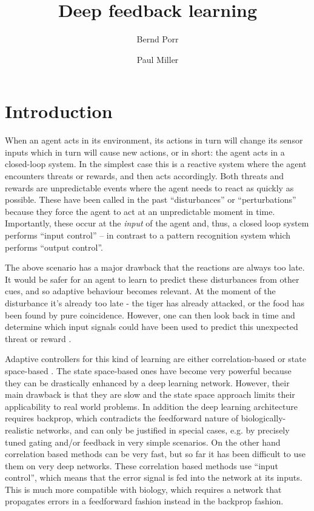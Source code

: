 \documentclass{llncs}
\title{Deep feedback learning}
\author{Bernd Porr \and Paul Miller}
\institute{Glasgow Neuro, bernd,paul@glasgowneuro.tech}
\begin{document}
\maketitle

\begin{abstract}
\end{abstract}

\section{Introduction}
When an agent acts in its environment, its actions in turn will
change its sensor inputs which in turn will cause new actions, or in
short: the agent acts in a closed-loop system. In the simplest case this
is a reactive system where the agent encounters threats or rewards, and
then acts accordingly. Both threats and rewards are unpredictable events
where the agent needs to react as quickly as possible. These have been
called in the past ``disturbances'' or ``perturbations'' because they force
the agent to act at an unpredictable moment in time. Importantly, these
occur at the \textsl{input} of the agent and, thus, a closed loop system
performs ``input control'' -- in contrast to a pattern recognition system
which performs ``output control''.

The above scenario has a major drawback that the reactions are always
too late.  It would be safer for an agent to learn to predict these
disturbances from other cues, and so adaptive behaviour becomes
relevant. At the moment of the disturbance it's already too late - the
tiger has already attacked, or the food has been found by pure
coincidence. However, one can then look back in time and determine
which input signals could have been used to predict this unexpected
threat or reward \cite{Sutton98,Woergoetter2005,PorrNecoInvco2003}.

Adaptive controllers for this kind of learning are either
correlation-based \cite{PorrNecoISO2003,Verschure91} or state
space-based \cite{Dayan1992,Sutton98}. The state space-based ones
have become very powerful because they can be drastically enhanced by
a deep learning network. However, their main drawback is that they are
slow and the state space approach limits their applicability to real
world problems. In addition the deep learning architecture requires
backprop, which contradicts the feedforward nature of
biologically-realistic networks, and can only be justified in special
cases, e.g. by precisely tuned gating and/or feedback in very simple
scenarios. On the other hand correlation based methods can be very
fast, but so far it has been difficult to use them on very deep networks.  These correlation based methods use ``input
control'', which means that the error signal is fed into the network
at its inputs. This is much more compatible with biology, which
requires a network that propagates errors in a feedforward fashion
instead in the backprop fashion.
\end{document}
